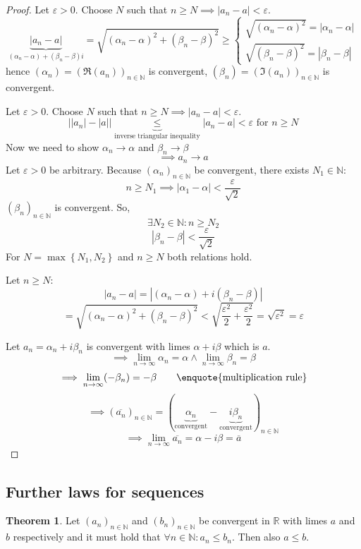 \documentclass[a4paper,landscape,twocolumn]{article}
\theoremstyle{definition}
\newtheorem{theorem}{Theorem}
\newcommand\set[1]{\left\{#1\right\}}
\newcommand\abs[1]{\left|#1\right|}
\newcommand\seq[1]{{\left(#1\right)}_{n \in \mathbb N}}
\begin{document}
\begin{proof}
  Let $\varepsilon > 0$. Choose $N$ such that $n \geq N \implies \abs{a_n - a} < \varepsilon$.
  \[
    \underbrace{\abs{a_n - a}}_{(\alpha_n - \alpha) + (\beta_n - \beta)i}
    = \sqrt{(\alpha_n - \alpha)^2 + (\beta_n - \beta)^2}
    \geq \begin{cases}
      \sqrt{(\alpha_n - \alpha)^2} = \abs{\alpha_n - \alpha} \\
      \sqrt{(\beta_n - \beta)^2} = \abs{\beta_n - \beta}
    \end{cases}
  \]
  hence $(\alpha_n) = (\Re(a_n))_{n\in\mathbb N}$ is convergent, $(\beta_n) = (\Im(a_n))_{n \in \mathbb N}$ is convergent.

  Let $\varepsilon > 0$. Choose $N$ such that $n \geq N \implies \abs{a_n - a} < \varepsilon$.
  \[
      \abs{\abs{a_n} - \abs{a}}
      \underbrace{\leq}_{\text{inverse triangular inequality}}
      \abs{a_n - a} < \varepsilon \text{ for } n \geq N
  \]
  Now we need to show $\alpha_n \to \alpha$ and $\beta_n \to \beta$
  \[ \implies a_n \to a \]
  Let $\varepsilon > 0$ be arbitrary.
  Because $\seq{\alpha_n}$ be convergent, there exists $N_1 \in \mathbb N$:
  \[ n \geq N_1 \implies \abs{\alpha_1 - \alpha} < \frac{\varepsilon}{\sqrt{2}} \]
  $\seq{\beta_n}$ is convergent. So,
  \[ \exists N_2 \in \mathbb N: n \geq N_2 \]
  \[ \abs{\beta_n - \beta} < \frac{\varepsilon}{\sqrt{2}} \]
  For $N = \max\set{N_1, N_2}$ and $n \geq N$ both relations hold.

  Let $n \geq N$:
  \[ \abs{a_n - a} = \abs{(\alpha_n - \alpha) + i (\beta_n - \beta)} \]
  \[
      = \sqrt{(\alpha_n - \alpha)^2 + (\beta_n - \beta)^2}
      < \sqrt{\frac{\varepsilon^2}{2} + \frac{\varepsilon^2}{2}}
      = \sqrt{\varepsilon^2} = \varepsilon
  \]

  Let $a_n = \alpha_n + i \beta_n$ is convergent with limes $\alpha + i \beta$ which is $a$.
  \[ \implies \lim_{n \to \infty} \alpha_n = \alpha \land \lim_{n \to \infty} \beta_n = \beta \]
  \[ \implies \lim_{n \to \infty} (-\beta_n) = -\beta \qquad\text{\enquote{multiplication rule}} \]
  \[ \implies (\overline{a_n})_{n \in \mathbb N} = (\underbrace{\alpha_n}_{\text{convergent}} - \underbrace{i \beta_n}_{\text{convergent}})_{n \in \mathbb N} \]
  \[ \implies \lim_{n \to \infty} \overline{a_n} = \alpha - i \beta = \overline{a} \]
\end{proof}

\subsection{Further laws for sequences}
%
\begin{theorem}
  Let $\seq{a_n}$ and $\seq{b_n}$ be convergent in $\mathbb R$ with limes $a$ and $b$ respectively
  and it must hold that $\forall n \in \mathbb N: a_n \leq b_n$. Then also $a \leq b$.
\end{theorem}
\end{document}
